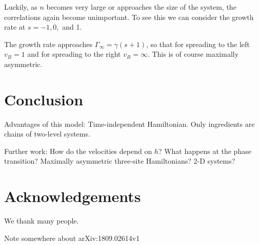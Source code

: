 \documentclass[aps,prx,reprint,superscriptaddress, longbibliography]{revtex4-1}
\newcommand{\charlie}[1]{ {\color{Magenta} {{#1}}}}
\begin{document}
Luckily, as $n$ becomes very large or approaches the size of the system, the correlations again become unimportant. To see this we can consider the growth rate at $s = -1, 0,$ and 1.

The growth rate approaches $\Gamma_\infty = \gamma(s+1)$, so that for spreading to the left $v_B=1$ and for spreading to the right $v_B=\infty$. This is of course maximally asymmetric. 

\section{Conclusion}

Advantages of this model:
Time-independent Hamiltonian.
Only ingredients are chains of two-level systems.

Further work:
How do the velocities depend on $h$?
What happens at the phase transition?
Maximally asymmetric three-site Hamiltonians?
2-D systems?


\section*{Acknowledgements}
We thank many people.

\charlie{Note somewhere about arXiv:1809.02614v1}



\begin{appendix}


\end{appendix}
\end{document}
